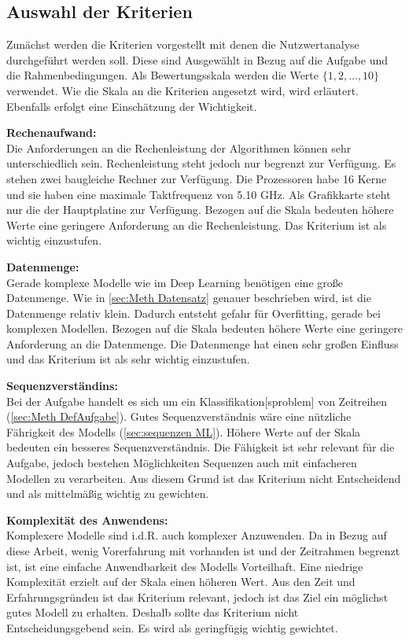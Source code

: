 \subsection{Auswahl der Kriterien}
Zunächst werden die Kriterien vorgestellt mit denen die Nutzwertanalyse durchgeführt werden soll. Diese sind Ausgewählt in Bezug auf die Aufgabe und die Rahmenbedingungen. Als Bewertungsskala werden die Werte \(\{1,2,\dots,10\}\) verwendet. Wie die Skala an die Kriterien angesetzt wird, wird erläutert. Ebenfalls erfolgt eine Einschätzung der Wichtigkeit.\par

\textbf{Rechenaufwand:}\\
Die Anforderungen an die Rechenleistung der Algorithmen können sehr unterschiedlich sein. Rechenleistung 
steht jedoch nur begrenzt zur Verfügung. Es stehen zwei baugleiche Rechner zur Verfügung. Die Prozessoren 
habe 16 Kerne und sie haben eine maximale Taktfrequenz von 5.10 GHz. Als Grafikkarte steht nur die der 
Hauptplatine zur Verfügung. Bezogen auf die Skala bedeuten höhere Werte eine geringere Anforderung an die Rechenleistung. Das Kriterium ist als wichtig einzustufen.\par

\textbf{Datenmenge:}\\
Gerade komplexe Modelle wie im \gls{Deep Learning} benötigen eine große Datenmenge. Wie in \autoref{sec:Meth Datensatz} genauer beschrieben wird, ist die Datenmenge relativ klein. Dadurch entsteht gefahr für \gls{Overfitting}, gerade bei komplexen Modellen. Bezogen auf die Skala bedeuten höhere Werte eine geringere Anforderung an die Datenmenge. Die Datenmenge hat einen sehr großen Einfluss und das Kriterium ist als sehr wichtig einzustufen. \par

\textbf{Sequenzverständins:}\\
Bei der Aufgabe handelt es sich um ein \gls{Klassifikation}[sproblem] von Zeitreihen (\autoref{sec:Meth DefAufgabe}). Gutes Sequenzverständnis wäre eine nützliche Fährigkeit des Modells (\autoref{sec:sequenzen ML}). Höhere Werte auf der Skala bedeuten ein besseres Sequenzverständnis. Die Fähigkeit ist sehr relevant für die Aufgabe, jedoch bestehen Möglichkeiten Sequenzen auch mit einfacheren Modellen zu verarbeiten. Aus diesem Grund ist das Kriterium nicht Entscheidend und als mittelmäßig wichtig zu gewichten. \par

\textbf{Komplexität des Anwendens:}\\
Komplexere Modelle sind i.d.R. auch komplexer Anzuwenden. Da in Bezug auf diese Arbeit, wenig Vorerfahrung mit  vorhanden ist und der Zeitrahmen begrenzt ist, ist eine einfache Anwendbarkeit des Modells Vorteilhaft. Eine niedrige Komplexität erzielt auf der Skala einen höheren Wert. Aus den Zeit und Erfahrungsgründen ist das Kriterium relevant, jedoch ist das Ziel ein möglichst gutes Modell zu erhalten. Deshalb sollte das Kriterium nicht Entscheidungsgebend sein. Es wird als geringfügig wichtig gewichtet. \par

